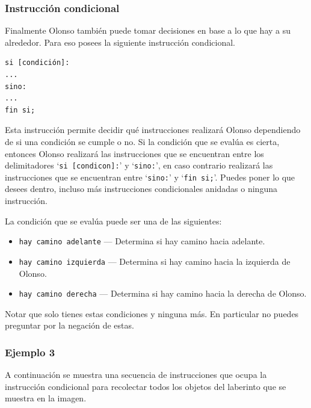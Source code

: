 \documentclass{oci}
\begin{document}
\begin{problemDescription}
\subsubsection*{Instrucción condicional}
Finalmente Olonso también puede tomar decisiones en base a lo que hay a su alrededor.
Para eso posees la siguiente instrucción condicional.

\begin{verbatim}
si [condición]:
...
sino:
...
fin si;
\end{verbatim}
  
Esta instrucción permite decidir qué instrucciones realizará Olonso dependiendo de si una condición se cumple o no.
Si la condición que se evalúa es cierta, entonces Olonso realizará las instrucciones que se encuentran entre los delimitadores `\texttt{si [condicon]:}' y `\texttt{sino:}', en caso contrario realizará las instrucciones que se encuentran entre `\texttt{sino:}' y `\texttt{fin si;}'.
Puedes poner lo que desees dentro, incluso más instrucciones condicionales anidadas o ninguna instrucción.

La condición que se evalúa puede ser una de las siguientes:

\begin{itemize}
\item \texttt{hay camino adelante} --- Determina si hay camino hacia adelante.
\item \texttt{hay camino izquierda} --- Determina si hay camino hacia la izquierda de Olonso. 
\item \texttt{hay camino derecha} --- Determina si hay camino hacia la derecha de Olonso. 
\end{itemize}

Notar que solo tienes estas condiciones y ninguna más.
En particular no puedes preguntar por la negación de estas.

\subsubsection*{Ejemplo 3}
A continuación se muestra una secuencia de instrucciones que ocupa la instrucción condicional para recolectar todos los objetos del laberinto que se muestra en la imagen.


\end{problemDescription}
\end{document}
